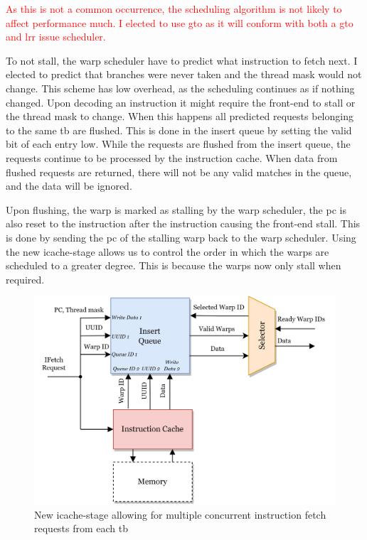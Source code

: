 \textcolor{red}{As this is not a common occurrence, the scheduling algorithm is not likely to affect performance much. I elected to use \acrshort{gto} as it will conform with both a \acrshort{gto} and \acrshort{lrr} issue scheduler.}

To not stall, the warp scheduler have to predict what instruction to fetch next. I elected to predict that branches were never taken and the thread mask would not change. This scheme has low overhead, as the scheduling continues as if nothing changed. Upon decoding an instruction it might require the front-end to stall or the thread mask to change. When this happens all predicted requests belonging to the same \acrshort{tb} are flushed. This is done in the insert queue by setting the valid bit of each entry low. While the requests are flushed from the insert queue, the requests continue to be processed by the instruction cache. When data from flushed requests are returned, there will not be any valid matches in the queue, and the data will be ignored. 

Upon flushing, the warp is marked as stalling by the warp scheduler, the \acrshort{pc} is also reset to the instruction after the instruction causing the front-end stall. This is done by sending the \acrshort{pc} of the stalling warp back to the warp scheduler. Using the new icache-stage allows us to control the order in which the warps are scheduled to a greater degree. This is because the warps now only stall when required. 


\begin{figure}
    \centering
    \includegraphics[width=\textwidth]{figures/New Icache-stage.png}
    \caption[Illustration of the new icache-stage.]{New icache-stage allowing for multiple concurrent instruction fetch requests from each \acrshort{tb}}
    \label{fig:new_icache_stage}
\end{figure}

